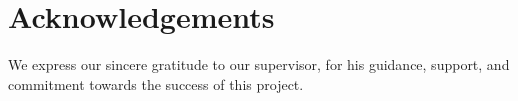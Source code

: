 \chapter*{Acknowledgements}

\vspace{10mm}
We express our sincere gratitude to our supervisor, \supervisorA \space for his guidance, support, and commitment towards the success of this project.
